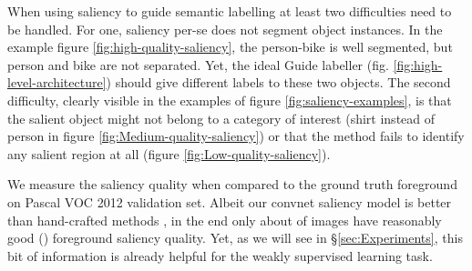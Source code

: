 \documentclass[british,10pt,twocolumn,letterpaper]{article}
\begin{document}
When using saliency to guide semantic labelling at least two difficulties
need to be handled. For one, saliency per-se does not segment object
instances. In the example figure \ref{fig:high-quality-saliency},
the person-bike is well segmented, but person and bike are not separated.
Yet, the ideal Guide labeller (fig. \ref{fig:high-level-architecture})
should give different labels to these two objects. The second difficulty,
clearly visible in the examples of figure \ref{fig:saliency-examples},
is that the salient object might not belong to a category of interest
(shirt instead of person in figure \ref{fig:Medium-quality-saliency})
or that the method fails to identify any salient region at all (figure
\ref{fig:Low-quality-saliency}). 

We measure the saliency quality when compared to the ground truth
foreground on Pascal VOC 2012 validation\emph{ }set. Albeit our convnet
saliency model is better than hand-crafted methods \cite{Jiang2013Cvpr,zhang2015MBD},
in the end only about  of images have reasonably good ()
foreground saliency quality. Yet, as we will see in \S \ref{sec:Experiments},
this bit of information is already helpful for the weakly supervised
learning task. 
\end{document}
